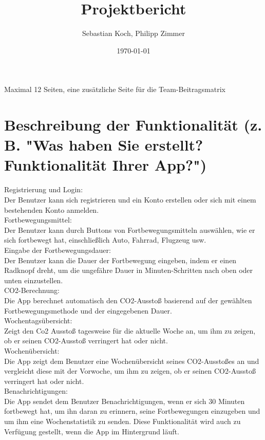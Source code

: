 \documentclass[a4paper,11pt]{article}
\title{Projektbericht}
\author{Sebastian Koch, Philipp Zimmer}
\date{\today}
\begin{document}
\maketitle
\tableofcontents

Maximal 12 Seiten, eine zusätzliche Seite für die Team-Beitragsmatrix


\section{Beschreibung der Funktionalität (z. B. "Was haben Sie erstellt? Funktionalität Ihrer App?")}
Registrierung und Login:\\
Der Benutzer kann sich registrieren und ein Konto erstellen oder sich mit einem bestehenden Konto anmelden.\\
Fortbewegungsmittel: \\
Der Benutzer kann durch Buttons von Fortbewegungsmitteln auswählen, wie er sich fortbewegt hat, einschließlich Auto, Fahrrad, Flugzeug usw. \\
Eingabe der Fortbewegungsdauer: \\
Der Benutzer kann die Dauer der Fortbewegung eingeben, indem er einen Radknopf dreht, um die ungefähre Dauer in Minuten-Schritten nach oben oder unten einzustellen.\\
CO2-Berechnung: \\
Die App berechnet automatisch den CO2-Ausstoß basierend auf der gewählten Fortbewegungsmethode und der eingegebenen Dauer.\\
Wochentagsübersicht:\\
Zeigt den Co2 Ausstoß tagesweise für die aktuelle Woche an, um ihm zu zeigen, ob er seinen CO2-Ausstoß verringert hat oder nicht.\\
Wochenübersicht: \\
Die App zeigt dem Benutzer eine Wochenübersicht seines CO2-Ausstoßes an und vergleicht diese mit der Vorwoche, um ihm zu zeigen, ob er seinen CO2-Ausstoß verringert hat oder nicht.\\
Benachrichtigungen: \\
Die App sendet dem Benutzer Benachrichtigungen, wenn er sich 30 Minuten fortbewegt hat, um ihn daran zu erinnern, seine Fortbewegungen einzugeben und um ihm eine Wochenstatistik zu senden. Diese Funktionalität wird auch zu Verfügung gestellt, wenn die App im Hintergrund läuft.\\
\end{document}
